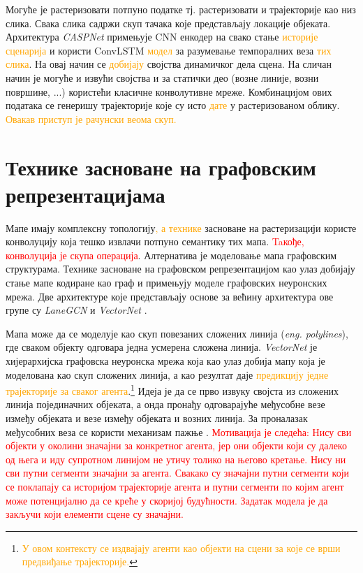 \documentclass[11pt,oneside]{memoir}
\begin{document}
Могуће је растеризовати потпуно податке тј. растеризовати и трајекторије као низ слика. Свака слика садржи скуп тачака које представљају
локације објеката. Архитектура \textit{CASPNet} \cite{caspnet} примењује CNN енкодер на свако стање \textcolor{orange}{историје сценарија} 
и користи ConvLSTM \cite{convlstm} \textcolor{orange}{модел} за разумевање
темпоралних веза \textcolor{orange}{тих слика}. На овај начин се \textcolor{orange}{добијају} својства динамичког дела сцена. 
На сличан начин је могуће и извући својства и за 
статички део (возне линије, возни површине, ...) користећи класичне конволутивне мреже. Комбинацијом ових података се генеришу
трајекторије које су исто \textcolor{orange}{дате} у растеризованом облику. \textcolor{orange}{Овакав приступ је рачунски веома скуп.}

\section{Технике засноване на графовским репрезентацијама}

Мапе имају комплексну топологију\textcolor{orange}{, а технике} засноване на растеризацији користе конволуцију која тешко 
извлачи потпуно семантику тих мапа. \textcolor{red}{Taкође, конволуција је скупа операција}. Алтернатива је моделовање мапа графовским структурама. 
Технике засноване на графовском репрезентацијом као улаз добијају стање мапе кодиране као граф и примењују моделе графовских неуронских мрежа. 
Две архитектуре које представљају основе за већину архитектура ове групе су \textit{LaneGCN} \cite{lanegcn} и \textit{VectorNet} \cite{vectornet}.

Мапа може да се моделује као скуп повезаних сложених линија (\textit{eng. polylines}), где сваком објекту одговара једна усмерена сложена линија. 
\textit{VectorNet} је хијерархијска графовска неуронска мрежа која као улаз добија мапу која је моделована као скуп 
сложених линија, а као резултат даје \textcolor{orange}{предикцију једне трајекторије за сваког агента}.\footnote{\textcolor{orange}{У овом контексту се издвајају агенти
као објекти на сцени за које се врши предвиђање трајекторије.}} Идеја је да се прво извуку својста из сложених 
линија појединачних објеката, а онда пронађу одговарајуће међусобне везе између објеката и везе између објеката и возних линија. 
За проналазак међусобних веза се користи механизам пажње \cite{attention_is_all_you_need, vectornet}.
\textcolor{red}{Мотивација је следећа: Нису сви објекти у околини значајни за конкретног агента,
јер они објекти који су далеко од њега и иду супротном линијом не утичу толико на његово кретање. Нису ни сви путни сегменти значајни за агента.
Свакако су значајни путни сегменти који се поклапају са историјом трајекторије агента и путни сегменти по којим агент може потенцијално да се креће
у скоријој будућности. Задатак модела је да закључи који елементи сцене су значајни.}
\end{document}
